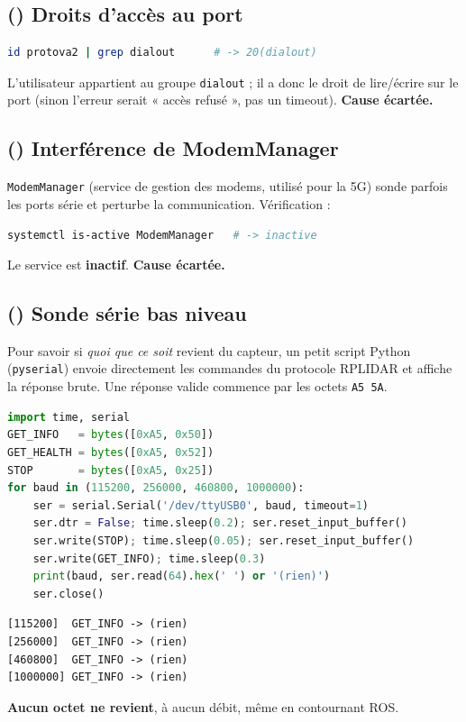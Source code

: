 \documentclass[a4paper,11pt]{article}
\newcommand{\ko}{\textcolor{danger}{\ding{55}}}
\begin{document}
\subsection{(\ko) Droits d'accès au port}
\begin{lstlisting}[language=bash]
id protova2 | grep dialout      # -> 20(dialout)
\end{lstlisting}
L'utilisateur appartient au groupe \texttt{dialout} ; il a donc le droit de
lire/écrire sur le port (sinon l'erreur serait « accès refusé », pas un
timeout). \textbf{Cause écartée.}

\subsection{(\ko) Interférence de ModemManager}
\texttt{ModemManager} (service de gestion des modems, utilisé pour la 5G) sonde
parfois les ports série et perturbe la communication. Vérification :
\begin{lstlisting}[language=bash]
systemctl is-active ModemManager   # -> inactive
\end{lstlisting}
Le service est \textbf{inactif}. \textbf{Cause écartée.}

\subsection{(\ko) Sonde série bas niveau}
Pour savoir si \emph{quoi que ce soit} revient du capteur, un petit script
Python (\texttt{pyserial}) envoie directement les commandes du protocole RPLIDAR
et affiche la réponse brute. Une réponse valide commence par les octets
\texttt{A5 5A}.
\begin{lstlisting}[language=Python]
import time, serial
GET_INFO   = bytes([0xA5, 0x50])
GET_HEALTH = bytes([0xA5, 0x52])
STOP       = bytes([0xA5, 0x25])
for baud in (115200, 256000, 460800, 1000000):
    ser = serial.Serial('/dev/ttyUSB0', baud, timeout=1)
    ser.dtr = False; time.sleep(0.2); ser.reset_input_buffer()
    ser.write(STOP); time.sleep(0.05); ser.reset_input_buffer()
    ser.write(GET_INFO); time.sleep(0.3)
    print(baud, ser.read(64).hex(' ') or '(rien)')
    ser.close()
\end{lstlisting}
\begin{lstlisting}
[115200]  GET_INFO -> (rien)
[256000]  GET_INFO -> (rien)
[460800]  GET_INFO -> (rien)
[1000000] GET_INFO -> (rien)
\end{lstlisting}
\textbf{Aucun octet ne revient}, à aucun débit, même en contournant ROS.
\end{document}
